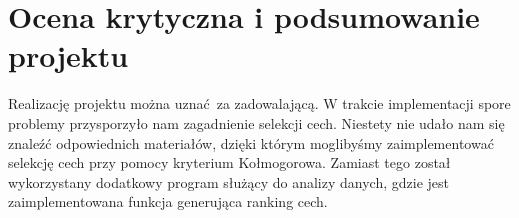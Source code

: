 \documentclass[11pt, a4paper, titlepage]{report}
\begin{document}
\section{Ocena krytyczna i podsumowanie projektu}
Realizację projektu można uznać za zadowalającą. W trakcie implementacji spore problemy przysporzyło nam zagadnienie selekcji cech. Niestety nie udało nam się znaleźć odpowiednich materiałów, dzięki którym moglibyśmy zaimplementować selekcję cech przy pomocy kryterium Kołmogorowa. Zamiast tego został wykorzystany dodatkowy program służący do analizy danych, gdzie jest zaimplementowana funkcja generująca ranking cech.
\end{document}

